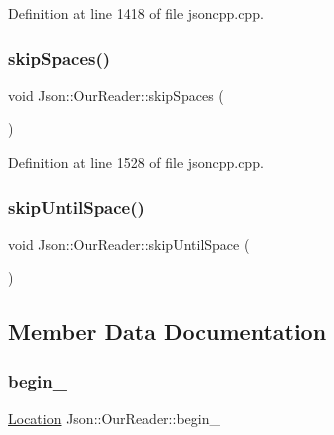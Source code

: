 Definition at line 1418 of file jsoncpp.\+cpp.

\hypertarget{class_json_1_1_our_reader_a6fbc6d58a4505e5ccadf330b57b17ca5}{}\label{class_json_1_1_our_reader_a6fbc6d58a4505e5ccadf330b57b17ca5} 
\subsubsection{\texorpdfstring{skip\+Spaces()}{skipSpaces()}}
{\footnotesize\ttfamily void Json\+::\+Our\+Reader\+::skip\+Spaces (\begin{DoxyParamCaption}{ }\end{DoxyParamCaption})\hspace{0.3cm}{\ttfamily [private]}}



Definition at line 1528 of file jsoncpp.\+cpp.

\hypertarget{class_json_1_1_our_reader_ad48bdaf5b686706f003e792fdbcbf102}{}\label{class_json_1_1_our_reader_ad48bdaf5b686706f003e792fdbcbf102} 
\subsubsection{\texorpdfstring{skip\+Until\+Space()}{skipUntilSpace()}}
{\footnotesize\ttfamily void Json\+::\+Our\+Reader\+::skip\+Until\+Space (\begin{DoxyParamCaption}{ }\end{DoxyParamCaption})\hspace{0.3cm}{\ttfamily [private]}}



\subsection{Member Data Documentation}
\hypertarget{class_json_1_1_our_reader_a9bda9d72335d52cd06e65f9eca3f70f5}{}\label{class_json_1_1_our_reader_a9bda9d72335d52cd06e65f9eca3f70f5} 
\subsubsection{\texorpdfstring{begin\+\_\+}{begin\_}}
{\footnotesize\ttfamily \hyperlink{class_json_1_1_our_reader_a1bdc7bbc52ba87cae6b19746f2ee0189}{Location} Json\+::\+Our\+Reader\+::begin\+\_\+\hspace{0.3cm}{\ttfamily [private]}}



